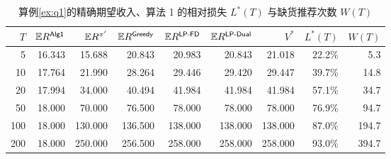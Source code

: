 \begin{table}[htbp]
\centering\small
\caption{算例\ref{ex:q1}的精确期望收入、算法 1 的相对损失 $L^{*}(T)$ 与缺货推荐次数 $W(T)$}\label{tab:q1}
\begin{tabular}{rrrrrrrrr}
\toprule
$T$ & $\mathbb E R^{\textsf{Alg1}}$ & $\mathbb E R^{\pi'}$ & $\mathbb E R^{\textsf{Greedy}}$ & $\mathbb E R^{\textsf{LP-FD}}$ & $\mathbb E R^{\textsf{LP-Dual}}$ & $V^{*}$ & $L^{*}(T)$ & $W(T)$ \\
\midrule
5 & 16.343 & 15.688 & 20.843 & 20.983 & 20.843 & 21.018 & 22.2\% & 5.3 \\
10 & 17.764 & 21.990 & 28.264 & 29.446 & 29.420 & 29.447 & 39.7\% & 14.8 \\
20 & 17.994 & 34.000 & 40.494 & 41.984 & 41.984 & 41.984 & 57.1\% & 34.7 \\
50 & 18.000 & 70.000 & 76.500 & 78.000 & 78.000 & 78.000 & 76.9\% & 94.7 \\
100 & 18.000 & 130.000 & 136.500 & 138.000 & 138.000 & 138.000 & 87.0\% & 194.7 \\
200 & 18.000 & 250.000 & 256.500 & 258.000 & 258.000 & 258.000 & 93.0\% & 394.7 \\
\bottomrule
\end{tabular}
\end{table}
